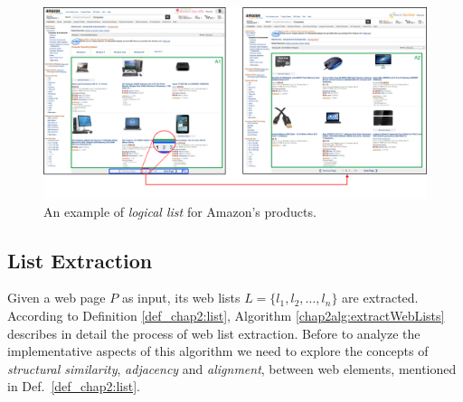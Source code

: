 \begin{figure}
\centering
	\includegraphics[scale=0.2]{imgs/chap_2/Amazon-discovery.png}
\caption{An example of \emph{logical list} for Amazon's products.}
\label{fig:amazonDiscovery}
\end{figure}

\subsection{List Extraction}
\label{2ListExtraction}
Given a web page $P$ as input, its web lists $L=\{l_1,l_2,\ldots,l_n\}$ are extracted. 
According to Definition \ref{def_chap2:list}, Algorithm \ref{chap2alg:extractWebLists} describes in detail the process of web list extraction. Before to analyze the implementative aspects of this algorithm we need to explore the concepts of \emph{structural similarity}, \emph{adjacency} and \emph{alignment}, between web elements, mentioned in Def.~\ref{def_chap2:list}. 

